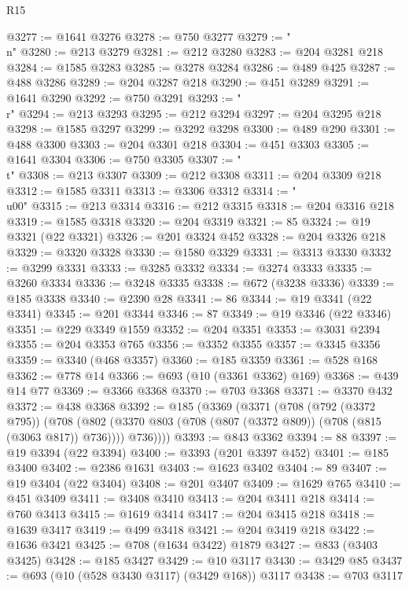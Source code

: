 \begin{lexlean}{R15}
\begin{coremodule}
{{{{{{{{{{{@3277 := @1641 @3276
@3278 := @750 @3277
@3279 := "\\n"
@3280 := @213 @3279
@3281 := @212 @3280
@3283 := @204 @3281 @218
@3284 := @1585 @3283
@3285 := @3278 @3284
@3286 := @489 @425
@3287 := @488 @3286
@3289 := @204 @3287 @218
@3290 := @451 @3289
@3291 := @1641 @3290
@3292 := @750 @3291
@3293 := "\\r"
@3294 := @213 @3293
@3295 := @212 @3294
@3297 := @204 @3295 @218
@3298 := @1585 @3297
@3299 := @3292 @3298
@3300 := @489 @290
@3301 := @488 @3300
@3303 := @204 @3301 @218
@3304 := @451 @3303
@3305 := @1641 @3304
@3306 := @750 @3305
@3307 := "\\t"
@3308 := @213 @3307
@3309 := @212 @3308
@3311 := @204 @3309 @218
@3312 := @1585 @3311
@3313 := @3306 @3312
@3314 := "\\u00"
@3315 := @213 @3314
@3316 := @212 @3315
@3318 := @204 @3316 @218
@3319 := @1585 @3318
@3320 := @204 @3319
@3321 := 85
@3324 := @19 @3321 (@22 @3321)
@3326 := @201 @3324 @452
@3328 := @204 @3326 @218
@3329 := @3320 @3328
@3330 := @1580 @3329
@3331 := @3313 @3330
@3332 := @3299 @3331
@3333 := @3285 @3332
@3334 := @3274 @3333
@3335 := @3260 @3334
@3336 := @3248 @3335
@3338 := @672 (@3238 @3336)
@3339 := @185 @3338
@3340 := @2390 @28
@3341 := 86
@3344 := @19 @3341 (@22 @3341)
@3345 := @201 @3344
@3346 := 87
@3349 := @19 @3346 (@22 @3346)
@3351 := @229 @3349 @1559
@3352 := @204 @3351
@3353 := @3031 @2394
@3355 := @204 @3353 @765
@3356 := @3352 @3355
@3357 := @3345 @3356
@3359 := @3340 (@468 @3357)
@3360 := @185 @3359
@3361 := @528 @168
@3362 := @778 @14
@3366 := @693 (@10 (@3361 @3362) @169)
@3368 := @439 @14 @77
@3369 := @3366 @3368
@3370 := @703 @3368
@3371 := @3370 @432
@3372 := @438 @3368
@3392 := @185
    (@3369
      (@3371
        (@708
          (@792 (@3372 @795))
          (@708
            (@802 (@3370 @803 (@708 (@807 (@3372 @809)) (@708 (@815 (@3063 @817)) @736))))
            @736))))
@3393 := @843 @3362
@3394 := 88
@3397 := @19 @3394 (@22 @3394)
@3400 := @3393 (@201 @3397 @452)
@3401 := @185 @3400
@3402 := @2386 @1631
@3403 := @1623 @3402
@3404 := 89
@3407 := @19 @3404 (@22 @3404)
@3408 := @201 @3407
@3409 := @1629 @765
@3410 := @451 @3409
@3411 := @3408 @3410
@3413 := @204 @3411 @218
@3414 := @760 @3413
@3415 := @1619 @3414
@3417 := @204 @3415 @218
@3418 := @1639 @3417
@3419 := @499 @3418
@3421 := @204 @3419 @218
@3422 := @1636 @3421
@3425 := @708 (@1634 @3422) @1879
@3427 := @833 (@3403 @3425)
@3428 := @185 @3427
@3429 := @10 @3117
@3430 := @3429 @85
@3437 := @693 (@10 (@528 @3430 @3117) (@3429 @168)) @3117
@3438 := @703 @3117
}}}}}}}}}}}
\end{coremodule}
\end{lexlean}
